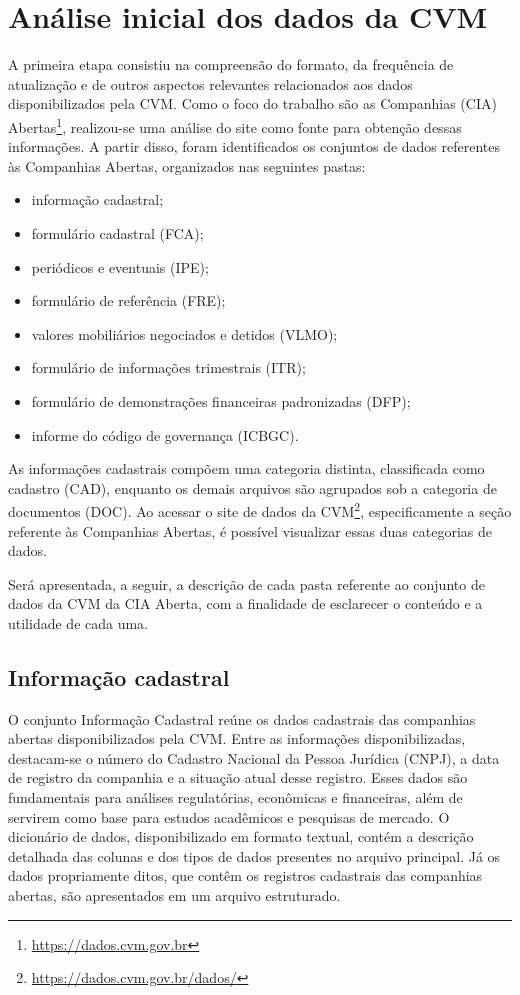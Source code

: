 \documentclass[recuosum=1.5cm]{iftex2024}
\begin{document}
\section{Análise inicial dos dados da CVM} \label{sec:analise_cvm}

A primeira etapa consistiu na compreensão do formato, da frequência de atualização e de outros aspectos relevantes relacionados aos dados disponibilizados pela CVM. Como o foco do trabalho são as Companhias (CIA) Abertas\footnote{\url{https://dados.cvm.gov.br}}, realizou-se uma análise do site como fonte para obtenção dessas informações. A partir disso, foram identificados os conjuntos de dados referentes às Companhias Abertas, organizados nas seguintes pastas:

\begin{itemize}
	\item informação cadastral;
	\item formulário cadastral (FCA);
	\item periódicos e eventuais (IPE);
	\item formulário de referência (FRE);
	\item valores mobiliários negociados e detidos (VLMO);
	\item formulário de informações trimestrais (ITR);
	\item formulário de demonstrações financeiras padronizadas (DFP);
	\item informe do código de governança (ICBGC).
\end{itemize}

As informações cadastrais compõem uma categoria distinta, classificada como cadastro (CAD), enquanto os demais arquivos são agrupados sob a categoria de documentos (DOC). Ao acessar o site de dados da CVM\footnote{\url{https://dados.cvm.gov.br/dados/}}, especificamente a seção referente às Companhias Abertas, é possível visualizar essas duas categorias de dados.

Será apresentada, a seguir, a descrição de cada pasta referente ao conjunto de dados da CVM da CIA Aberta, com a finalidade de esclarecer o conteúdo e a utilidade de cada uma.

\subsection{Informação cadastral} 
O conjunto Informação Cadastral reúne os dados cadastrais das companhias abertas disponibilizados pela CVM. Entre as informações disponibilizadas, destacam-se o número do Cadastro Nacional da Pessoa Jurídica (CNPJ), a data de registro da companhia e a situação atual desse registro. Esses dados são fundamentais para análises regulatórias, econômicas e financeiras, além de servirem como base para estudos acadêmicos e pesquisas de mercado. O dicionário de dados, disponibilizado em formato textual, contém a descrição detalhada das colunas e dos tipos de dados presentes no arquivo principal. Já os dados propriamente ditos, que contêm os registros cadastrais das companhias abertas, são apresentados em um arquivo estruturado.
\end{document}
